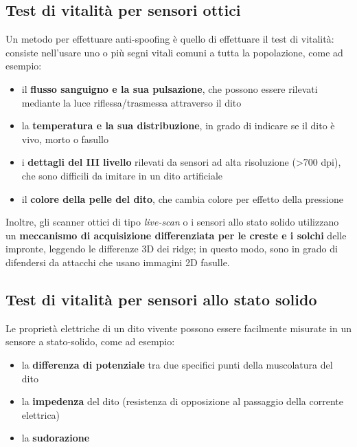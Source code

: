 \subsection{Test di vitalità per sensori ottici}
Un metodo per effettuare anti-spoofing è quello di effettuare il test di vitalità:
consiste nell'usare uno o più segni vitali comuni a tutta la popolazione,
come ad esempio:
\begin{itemize}
    \item il \textbf{flusso sanguigno e la sua pulsazione}, che possono essere rilevati mediante la luce riflessa/trasmessa attraverso il dito 
    \item la \textbf{temperatura e la sua distribuzione}, in grado di indicare se il dito è vivo, morto o fasullo
    \item i \textbf{dettagli del III livello} rilevati da sensori ad alta risoluzione (>700 dpi), che sono difficili da imitare in un dito artificiale
    \item il \textbf{colore della pelle del dito}, che cambia colore per effetto della pressione
\end{itemize}

\noindent Inoltre, gli scanner ottici di tipo \textit{live-scan} o i sensori allo stato solido 
utilizzano un \textbf{meccanismo di acquisizione differenziata per le creste e i solchi} delle impronte, 
leggendo le differenze 3D dei ridge; in questo modo, sono in grado di difendersi
da attacchi che usano immagini 2D fasulle.

\subsection{Test di vitalità per sensori allo stato solido}
Le proprietà elettriche di un dito vivente possono essere facilmente 
misurate in un sensore a stato-solido, come ad esempio:
\begin{itemize}
    \item la \textbf{differenza di potenziale} tra due specifici punti della muscolatura del dito
    \item la \textbf{impedenza} del dito (resistenza di opposizione al passaggio della corrente elettrica)
    \item la \textbf{sudorazione}
\end{itemize}